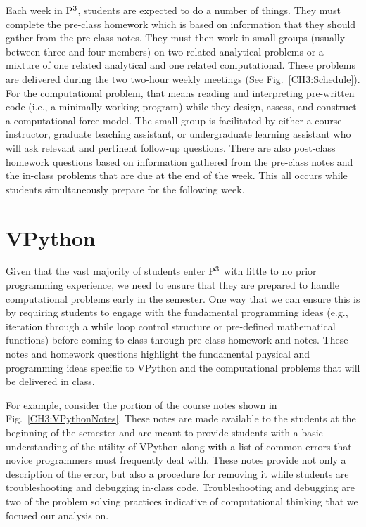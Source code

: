\documentclass{msuphddissertation}
\begin{document}
\begin{doublespace}
Each week in ${\rm P}^{3}$, students are expected to do a number of things. They must complete the pre-class homework which is based on information that they should gather from the pre-class notes.  They must then work in small groups (usually between three and four members) on two related analytical problems or a mixture of one related analytical and one related computational.  These problems are delivered during the two two-hour weekly meetings (See Fig.~\ref{CH3:Schedule}).  For the computational problem, that means reading and interpreting pre-written code (i.e., a minimally working program) while they design, assess, and construct a computational force model.  The small group is facilitated by either a course instructor, graduate teaching assistant, or undergraduate learning assistant who will ask relevant and pertinent follow-up questions.  There are also post-class homework questions based on information gathered from the pre-class notes and the in-class problems that are due at the end of the week.  This all occurs while students simultaneously prepare for the following week.

\section{VPython}

Given that the vast majority of students enter ${\rm P}^{3}$ with little to no prior programming experience, we need to ensure that they are prepared to handle computational problems early in the semester.  One way that we can ensure this is by requiring students to engage with the fundamental programming ideas (e.g., iteration through a while loop control structure or pre-defined mathematical functions) before coming to class through pre-class homework and notes.  These notes and homework questions highlight the fundamental physical and programming ideas specific to VPython and the computational problems that will be delivered in class.

For example, consider the portion of the course notes shown in Fig.~\ref{CH3:VPythonNotes}.  These notes are made available to the students at the beginning of the semester and are meant to provide students with a basic understanding of the utility of VPython along with a list of common errors that novice programmers must frequently deal with.  These notes provide not only a description of the error, but also a procedure for removing it while students are troubleshooting and debugging in-class code.  Troubleshooting and debugging are two of the problem solving practices indicative of computational thinking that we focused our analysis on.


\end{doublespace}
\end{document}
